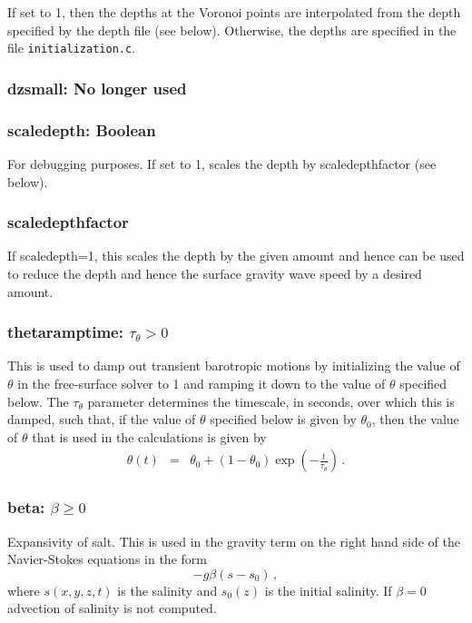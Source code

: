 If set to 1, then the depths at the Voronoi points are interpolated from the
depth specified by the depth file (see below).  Otherwise, the depths are
specified in the file \verb+initialization.c+.

\subsubsection{dzsmall: No longer used}

\subsubsection{scaledepth: Boolean}

For debugging purposes.  If set to 1, scales the depth by scaledepthfactor (see below).

\subsubsection{scaledepthfactor}

If scaledepth=1, this scales the depth by the given amount and hence
can be used to reduce the depth and hence the surface gravity wave speed by
a desired amount.

\subsubsection{thetaramptime: $\tau_\theta >0$}

This is used to damp out transient barotropic motions by initializing
the value of $\theta$ in the free-surface solver to 1 and ramping it
down to the value of $\theta$ specified below.  The $\tau_\theta$ parameter
determines the timescale, in seconds, over which this is damped, such that, if the value
of $\theta$ specified below is given by $\theta_0$, then the value of
$\theta$ that is used in the calculations is given by
\begin{eqnarray}
\theta(t) &=& \theta_0 + (1-\theta_0)\exp\left(-\frac{t}{\tau_\theta}\right)\nonumber\,.
\end{eqnarray}

\subsubsection{beta: $\beta\ge 0$}

Expansivity of salt.  This is used in the gravity term on the right hand side of
the Navier-Stokes equations in the form
\[
-g\beta\left(s-s_0\right)\,,
\]
where $s(x,y,z,t)$ is the salinity and $s_0(z)$ is the initial salinity.  If $\beta=0$
advection of salinity is not computed.  


